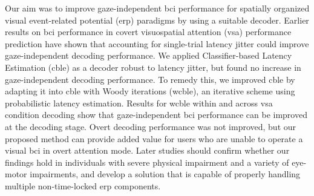 Our aim was to improve gaze-independent \ac{bci} performance for spatially
organized visual event-related potential (\ac{erp}) paradigms by using a suitable
decoder.
Earlier results on \ac{bci} performance in covert visuospatial attention
(\ac{vsa}) performance prediction have shown that accounting for single-trial
latency jitter could improve gaze-independent decoding performance.
We applied Classifier-based Latency Estimation (\ac{cble}) as a decoder robust to latency
jitter, but found no increase in gaze-independent decoding performance.
To remedy this, we improved \ac{cble} by adapting it into \ac{cble} with Woody
iterations (\ac{wcble}), an iterative scheme using probabilistic latency estimation.
Results for \ac{wcble} within and across \ac{vsa} condition decoding show that
gaze-independent \ac{bci} performance can be improved at the decoding stage.
Overt decoding performance was not improved, but our proposed method can
provide added value for users who are unable to operate a visual \ac{bci} in overt
attention mode.
Later studies should confirm whether our findings hold in individuals with
severe physical impairment and a variety of eye-motor impairments, and develop a
solution that is capable of properly handling multiple non-time-locked \ac{erp}
components.
